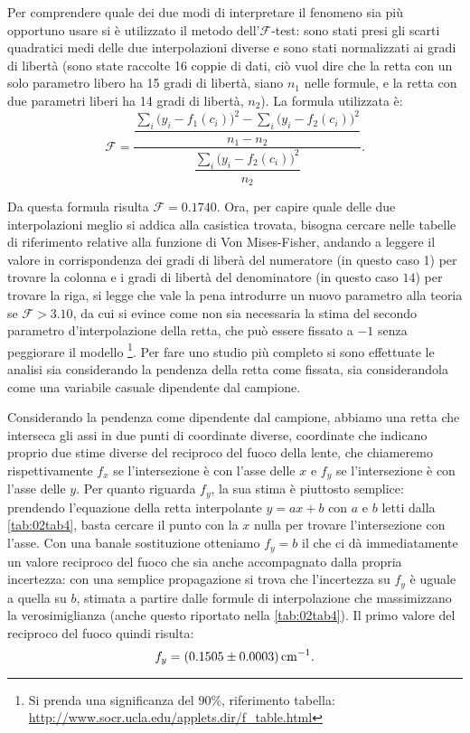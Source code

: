 Per comprendere quale dei due modi di interpretare il fenomeno sia più opportuno usare si \`e utilizzato il metodo dell'$\mathcal{F}$-test:
 sono stati presi gli scarti quadratici medi delle due interpolazioni diverse e sono stati normalizzati ai gradi di libertà
 (sono state raccolte 16 coppie di dati, ciò vuol dire che la retta con un solo parametro libero ha 15 gradi di libertà,
 siano $n_1$ nelle formule, e la retta con due parametri liberi ha 14 gradi di libertà, $n_2$).
 La formula utilizzata è:
\[\mathcal{F}=\frac{\dfrac{{\sum_i \big( y_i-f_1 (c_i) \big) ^2} - {\sum_i \big( y_i-f_2 (c_i) \big) ^2}}{n_1-n_2}}{\dfrac{\sum_i \big( y_i-f_2 
(c_i) \big) ^2}{n_2}}.\]

Da questa formula risulta $\mathcal{F} = 0.1740$. Ora, per capire quale delle due interpolazioni meglio si addica alla
 casistica trovata, bisogna cercare nelle tabelle di riferimento relative alla funzione di Von Mises-Fisher, andando a leggere il valore
 in corrispondenza dei gradi di liberà del numeratore (in questo caso 1) per trovare la colonna e i gradi di libertà del denominatore
 (in questo caso $14$) per trovare la riga, si legge che vale la pena introdurre un nuovo parametro alla teoria 
 se $\mathcal{F} > 3.10$, 
 da cui si evince come non sia necessaria la stima del secondo parametro d'interpolazione della retta, che 
 può essere fissato a $-1$ senza peggiorare il modello
 \footnote{Si prenda una significanza del $90\%$, 
 riferimento tabella: \url{http://www.socr.ucla.edu/applets.dir/f_table.html}}. 
 Per fare uno studio pi\`u completo si sono effettuate le analisi sia considerando la pendenza della retta come fissata,
 sia considerandola come una variabile casuale dipendente dal campione.

Considerando la pendenza come dipendente dal campione, abbiamo una retta che interseca gli assi in due punti di coordinate diverse,
 coordinate che indicano proprio due stime diverse del reciproco del fuoco della lente, che chiameremo rispettivamente
$f_x$ se l'intersezione è con l'asse delle $x$ e $f_y$ se l'intersezione è con l'asse delle $y$.
 Per quanto riguarda $f_y$, la sua stima è piuttosto semplice: prendendo l'equazione della retta interpolante $y=ax + b$
 con $a$ e $b$ letti dalla \autoref{tab:02tab4}, basta cercare il punto con la $x$ nulla per trovare l'intersezione con l'asse.
 Con una banale sostituzione otteniamo $f_y= b$ il che ci dà immediatamente un valore reciproco del fuoco che sia anche
 accompagnato dalla propria incertezza: con una semplice propagazione si trova che l'incertezza su $f_y$ è uguale a quella su $b$,
 stimata a partire dalle formule di interpolazione che massimizzano la verosimiglianza (anche questo riportato nella 
\autoref{tab:02tab4}).
 Il primo valore del reciproco del fuoco quindi risulta:
\[f_y = (0.1505 \pm 0.0003) \,\mathrm{cm}^{-1}.\]

